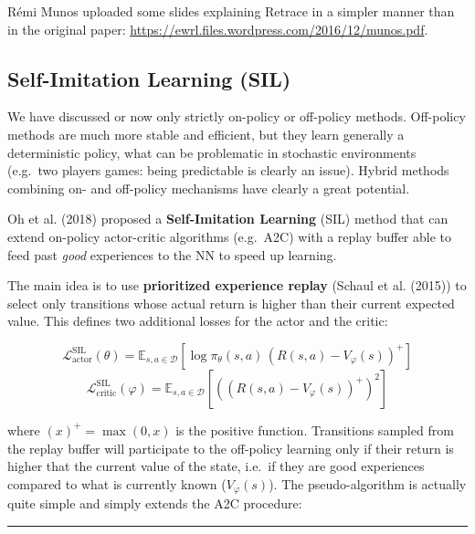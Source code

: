 \documentclass[
  letterpaper,
  DIV=11,
  numbers=noendperiod]{scrreprt}
\begin{document}
Rémi Munos uploaded some slides explaining Retrace in a simpler manner
than in the original paper:
\url{https://ewrl.files.wordpress.com/2016/12/munos.pdf}.

\hypertarget{self-imitation-learning-sil}{%
\subsection{Self-Imitation Learning
(SIL)}\label{self-imitation-learning-sil}}

We have discussed or now only strictly on-policy or off-policy methods.
Off-policy methods are much more stable and efficient, but they learn
generally a deterministic policy, what can be problematic in stochastic
environments (e.g.~two players games: being predictable is clearly an
issue). Hybrid methods combining on- and off-policy mechanisms have
clearly a great potential.

Oh et al. (2018) proposed a \textbf{Self-Imitation Learning} (SIL)
method that can extend on-policy actor-critic algorithms (e.g.~A2C) with
a replay buffer able to feed past \emph{good} experiences to the NN to
speed up learning.

The main idea is to use \textbf{prioritized experience replay} (Schaul
et al. (2015)) to select only transitions whose actual return is higher
than their current expected value. This defines two additional losses
for the actor and the critic:

\[
    \mathcal{L}^\text{SIL}_\text{actor}(\theta) = \mathbb{E}_{s, a \in \mathcal{D}}[\log \pi_\theta(s, a) \, (R(s, a) - V_\varphi(s))^+]
\] \[
    \mathcal{L}^\text{SIL}_\text{critic}(\varphi) = \mathbb{E}_{s, a \in \mathcal{D}}[((R(s, a) - V_\varphi(s))^+)^2]
\]

where \((x)^+ = \max(0, x)\) is the positive function. Transitions
sampled from the replay buffer will participate to the off-policy
learning only if their return is higher that the current value of the
state, i.e.~if they are good experiences compared to what is currently
known (\(V_\varphi(s)\)). The pseudo-algorithm is actually quite simple
and simply extends the A2C procedure:

\begin{center}\rule{0.5\linewidth}{0.5pt}\end{center}
\end{document}
